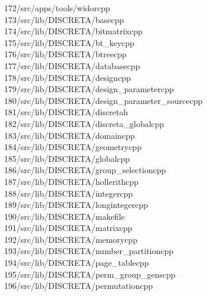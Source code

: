 \begin{tabbing}
172\>/src/apps/tools/widorcpp\\[0pt]
173\>/src/lib/DISCRETA/basecpp\\[0pt]
174\>/src/lib/DISCRETA/bitmatrixcpp\\[0pt]
175\>/src/lib/DISCRETA/bt\_keycpp\\[0pt]
176\>/src/lib/DISCRETA/btreecpp\\[0pt]
177\>/src/lib/DISCRETA/databasecpp\\[0pt]
178\>/src/lib/DISCRETA/designcpp\\[0pt]
179\>/src/lib/DISCRETA/design\_parametercpp\\[0pt]
180\>/src/lib/DISCRETA/design\_parameter\_sourcecpp\\[0pt]
181\>/src/lib/DISCRETA/discretah\\[0pt]
182\>/src/lib/DISCRETA/discreta\_globalcpp\\[0pt]
183\>/src/lib/DISCRETA/domaincpp\\[0pt]
184\>/src/lib/DISCRETA/geometrycpp\\[0pt]
185\>/src/lib/DISCRETA/globalcpp\\[0pt]
186\>/src/lib/DISCRETA/group\_selectioncpp\\[0pt]
187\>/src/lib/DISCRETA/hollerithcpp\\[0pt]
188\>/src/lib/DISCRETA/integercpp\\[0pt]
189\>/src/lib/DISCRETA/longintegercpp\\[0pt]
190\>/src/lib/DISCRETA/makefile\\[0pt]
191\>/src/lib/DISCRETA/matrixcpp\\[0pt]
192\>/src/lib/DISCRETA/memorycpp\\[0pt]
193\>/src/lib/DISCRETA/number\_partitioncpp\\[0pt]
194\>/src/lib/DISCRETA/page\_tablecpp\\[0pt]
195\>/src/lib/DISCRETA/perm\_group\_genscpp\\[0pt]
196\>/src/lib/DISCRETA/permutationcpp\\[0pt]

\end{tabbing}
